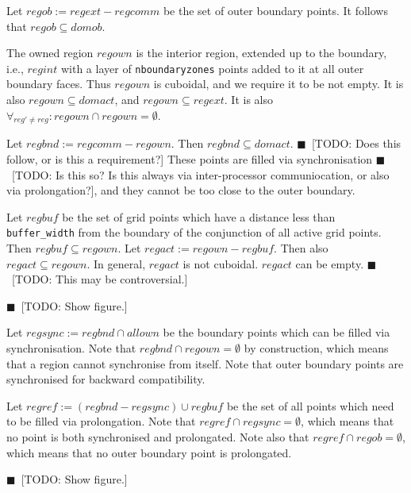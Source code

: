 \documentclass[oneside]{amsart}
\newcommand{\todo}[1]{{\color{blue}$\blacksquare$~\textsf{[TODO: #1]}}}
\newcommand{\code}[1]{\texttt{#1}}
\begin{document}
Let $regob := regext - regcomm$ be the set of outer boundary points.
It follows that $regob \subseteq domob$.

The owned region $regown$ is the interior region, extended up to the
boundary, i.e., $regint$ with a layer of \code{nboundaryzones} points
added to it at all outer boundary faces.  Thus $regown$ is cuboidal,
and we require it to be not empty.  It is also $regown \subseteq
domact$, and $regown \subseteq regext$.  It is also $\forall_{reg' \ne
  reg}: regown \cap regown = \emptyset$.

Let $regbnd := regcomm - regown$.  Then $regbnd \subseteq domact$.
\todo{Does this follow, or is this a requirement?}  These points are
filled via synchronisation \todo{Is this so?  Is this always via
  inter-processor communiocation, or also via prolongation?}, and they
cannot be too close to the outer boundary.

Let $regbuf$ be the set of grid points which have a distance less than
\code{buffer\_width} from the boundary of the conjunction of all
active grid points.  Then $regbuf \subseteq regown$.  Let $regact :=
regown - regbuf$.  Then also $regact \subseteq regown$.  In general,
$regact$ is not cuboidal.  $regact$ can be empty.  \todo{This may be
  controversial.}

\todo{Show figure.}

Let $regsync := regbnd \cap allown$ be the boundary points which can
be filled via synchronisation.  Note that $regbnd \cap regown =
\emptyset$ by construction, which means that a region cannot
synchronise from itself.  Note that outer boundary points are
synchronised for backward compatibility.

Let $regref := (regbnd - regsync) \cup regbuf$ be the set of all
points which need to be filled via prolongation.  Note that $regref
\cap regsync = \emptyset$, which means that no point is both
synchronised and prolongated.  Note also that $regref \cap regob =
\emptyset$, which means that no outer boundary point is prolongated.

\todo{Show figure.}
\end{document}

